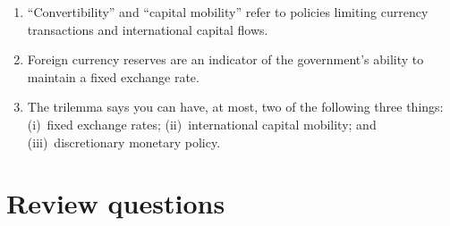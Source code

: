 \setlength{\leftmargini}{.5\oldleftmargini}
\begin{enumerate}
\item ``Convertibility'' and ``capital mobility'' refer to
policies limiting currency transactions and international capital flows.

\item Foreign currency reserves are an indicator of the
government's ability to maintain a fixed exchange rate.

\item The trilemma says you can have, at most, two of the following three
things:
(i)~fixed exchange rates;
(ii)~international capital mobility; and
(iii)~discretionary monetary policy.
\end{enumerate}
\setlength{\leftmargini}{\oldleftmargini}

\section*{Review questions}

